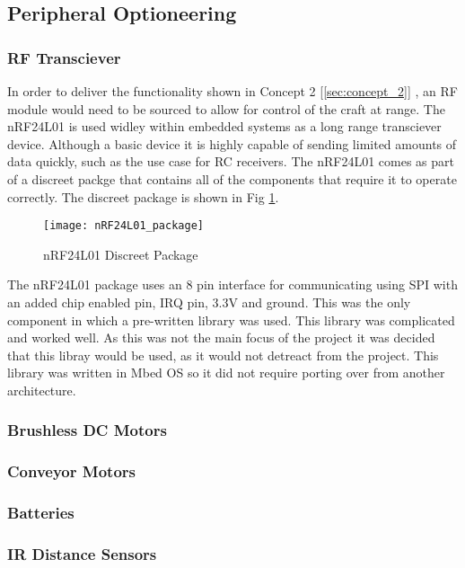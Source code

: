 \documentclass [11pt]{article}
\begin{document}
\subsection{Peripheral Optioneering}
\subsubsection{RF Transciever}

In order to deliver the functionality shown in Concept 2 [\ref{sec:concept_2}] , an RF module would need to be sourced to allow for control of the craft at range. The nRF24L01 is used widley within embedded systems as a long range transciever device. Although a basic device it is highly capable of sending limited amounts of data quickly, such as the use case for RC receivers. The nRF24L01 comes as part of a discreet packge that contains all of the components that require it to operate correctly. The discreet package is shown in Fig \ref{fig:nRF24L01_package}.

\begin{figure}[H]
\centerline{\texttt{[image: nRF24L01\_package]}}
\caption{nRF24L01 Discreet Package}
\label{fig:nRF24L01_package}
\end{figure}

The nRF24L01 package uses an 8 pin interface for communicating using SPI with an added chip enabled pin, IRQ pin, 3.3V and ground. This was the only component in which a pre-written library was used. This library was complicated and worked well. As this was not the main focus of the project it was decided that this libray would be used, as it would not detreact from the project. This library was written in Mbed OS so it did not require porting over from another architecture.  

\subsubsection{Brushless DC Motors}

\subsubsection{Conveyor Motors}

\subsubsection{Batteries}

\subsubsection{IR Distance Sensors}
\end{document}
